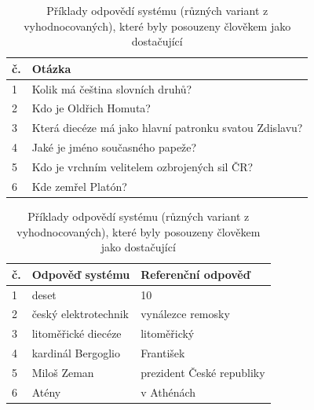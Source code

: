 \begin{table}[H]
\centering
\begin{tabular}{|l|l|}
\hline
\textbf{č.}   &\textbf{Otázka}                                         \\ \hline
1               &Kolik má čeština slovních druhů?                        \\ \hline
2                &Kdo je Oldřich Homuta?                                  \\ \hline
3                &Která diecéze má jako hlavní patronku svatou Zdislavu?  \\ \hline
4                &Jaké je jméno současného papeže?                        \\ \hline
5                &Kdo je vrchním velitelem ozbrojených sil ČR?            \\ \hline
6                & Kde zemřel Platón?                                      \\ \hline
\end{tabular}
\begin{tabular}{|l|l|l|} 
\hline
\textbf{č.}   &\textbf{Odpověď systému} & \textbf{Referenční odpověď} \\ \hline
1               &deset                    & 10                          \\ \hline
2               &český elektrotechnik     & vynálezce remosky           \\ \hline
3               &litoměřické diecéze      & litoměřický                 \\ \hline
4               &kardinál Bergoglio       & František                   \\ \hline
5               &Miloš Zeman              & prezident České republiky   \\ \hline
6               &Atény                    & v Athénách                  \\ \hline
\end{tabular}
\caption{Příklady odpovědí systému (různých variant z vyhodnocovaných), které byly posouzeny člověkem jako dostačující}
\label{tab:human_eval_examples}
\end{table}

